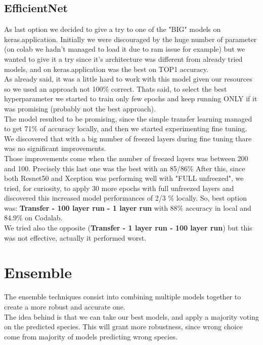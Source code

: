 \documentclass[10pt]{article}
\begin{document}
\subsection{EfficientNet}
As last option we decided to give a try to one of the "BIG" models on keras.application.
Initially we were discouraged by the huge number of parameter (on colab we hadn't managed to load it due to ram issue for example)
but we wanted to give it a try since it's architecture was different from already tried models, and on keras.application was the best on TOP1 accuracy.\\
As already said, it was a little hard to work with this model given our resources so we used an approach not 100\% correct.
Thats said, to select the best hyperparameter we started to train only few epochs and keep running ONLY if it was promising (probably not the best approach).\\
The model resulted to be promising, since the simple transfer learning managed to get 71\% of accuracy locally, and then we started experimenting fine tuning.\\
We discovered that with a big number of freezed layers during fine tuning thare was no significant improvements.\\
Those improvements come when the number of freezed layers was between 200 and 100. Precisely this last one was the best with an 85/86\% 
After this, since both Resnet50 and Xception was performing well with "FULL unfreezed", we tried, for curiosity, to apply 30 more epochs with full unfreezed layers and discovered this increased model performances of 2/3 \% locally.
So, best option was: \textbf{Transfer - 100 layer run - 1 layer run} with 88\% accuracy in local and 84.9\% on Codalab.\\
We tried also the opposite (\textbf{Transfer - 1 layer run - 100 layer run}) but this was not effective, actually it performed worst.



\section{Ensemble}
The ensemble techniques consist into combining multiple models together to create a more robust and accurate one.\\
The idea behind is that we can take our best models, and apply a majority voting on the predicted species.
This will grant more robustness, since wrong choice come from majority of models predicting wrong species.
\end{document}
